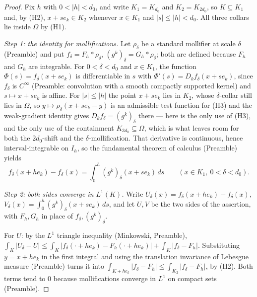 \begin{proof}
Fix $h$ with $0<|h|<d_0$, and write $K_1=K_{d_0}$ and $K_2=K_{2d_0}$, so
$K\subseteq K_1$ and, by (H2), $x+se_k\in K_2$ whenever $x\in K_1$ and
$|s|\le|h|<d_0$.  All three collars lie inside $\Omega$ by (H1).

\emph{Step 1: the identity for mollifications.}  Let $\rho_\delta$ be a standard
mollifier at scale $\delta$ (Preamble) and put $f_\delta=F_h*\rho_\delta$,
$(g^k)_\delta=G_h*\rho_\delta$; both are defined because $F_h$ and $G_h$ are
integrable.  For $0<\delta<d_0$ and $x\in K_1$, the function
$\Phi(s)=f_\delta(x+se_k)$ is differentiable in $s$ with
$\Phi'(s)=D_kf_\delta(x+se_k)$, since $f_\delta$ is $C^\infty$ (Preamble:
convolution with a smooth compactly supported kernel) and $s\mapsto x+se_k$ is
affine.  For $|s|\le|h|$ the point $x+se_k$ lies in $K_2$, whose $\delta$-collar
still lies in $\Omega$, so $y\mapsto\rho_\delta(x+se_k-y)$ is an admissible test
function for (H3) and the weak-gradient identity gives
$D_kf_\delta=(g^k)_\delta$ there --- here is the only use of (H3), and the only
use of the containment $K_{3d_0}\subseteq\Omega$, which is what leaves room for
both the $2d_0$-shift and the $\delta$-mollification.  That derivative is
continuous, hence interval-integrable on $I_h$, so the fundamental theorem of
calculus (Preamble) yields
\[
f_\delta(x+he_k)-f_\delta(x)=\int_0^h(g^k)_\delta(x+se_k)\,ds
\qquad(x\in K_1,\ 0<\delta<d_0).
\tag{7}
\]

\emph{Step 2: both sides converge in $L^1(K)$.}  Write
$U_\delta(x)=f_\delta(x+he_k)-f_\delta(x)$,
$V_\delta(x)=\int_0^h(g^k)_\delta(x+se_k)\,ds$, and let $U,V$ be the two sides
of the assertion, with $F_h,G_h$ in place of $f_\delta,(g^k)_\delta$.

For $U$: by the $L^1$ triangle inequality (Minkowski, Preamble),
$\int_K|U_\delta-U|\le\int_K|f_\delta(\cdot+he_k)-F_h(\cdot+he_k)|+\int_K|f_\delta-F_h|$.
Substituting $y=x+he_k$ in the first integral and using the translation
invariance of Lebesgue measure (Preamble) turns it into
$\int_{K+he_k}|f_\delta-F_h|\le\int_{K_2}|f_\delta-F_h|$, by (H2).  Both terms
tend to $0$ because mollifications converge in $L^1$ on compact sets
(Preamble).


\end{proof}

